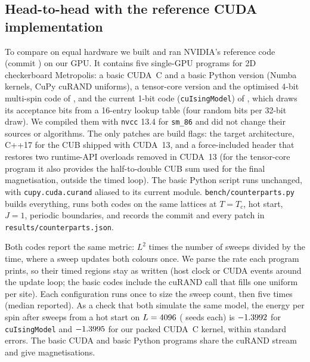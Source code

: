 \documentclass[11pt]{article}
\begin{document}
\subsection{Head-to-head with the reference CUDA implementation}
\label{sec:headtohead}

To compare on equal hardware we built and ran NVIDIA's reference code \citep{IsingGPURepo}
(commit \texttt{\cpCommit}) on our GPU. It contains five single-GPU programs for 2D
checkerboard Metropolis: a basic CUDA~C and a basic
Python version (Numba kernels, CuPy cuRAND uniforms), a tensor-core version and the optimised
4-bit multi-spin code of \citet{Romero2020}, and the current 1-bit code (\texttt{cuIsingModel})
of \citet{Bisson2025}, which draws its acceptance bits from a 16-entry lookup table (four
random bits per 32-bit draw). We compiled them with \texttt{nvcc} 13.4 for \texttt{sm\_86} and
did not change their sources or algorithms. The only patches are build flags: the target
architecture, C++17 for the CUB shipped with CUDA~13, and a force-included header that restores
two runtime-API overloads removed in CUDA~13 (for the tensor-core program it also provides the
half-to-double CUB sum used for the final magnetisation, outside the timed loop). The basic
Python script runs unchanged, with \texttt{cupy.cuda.curand} aliased to its current module.
\texttt{bench/counterparts.py} builds everything, runs both codes on the same lattices at
$T=T_c$, hot start, $J=1$, periodic boundaries, and records the commit and every patch in
\texttt{results/counterparts.json}.

Both codes report the same metric: $L^2$ times the number of sweeps divided by the time, where a
sweep updates both colours once. We parse the rate each program prints, so their timed regions
stay as written (host clock or CUDA events around the update loop; the basic codes include the
cuRAND call that fills one uniform per site). Each configuration runs once to size the sweep count, then
five times (median reported). As a check that both simulate the same model, the
energy per spin after \cpEnergySweeps{} sweeps from a hot start on $L=4096$ (\cpEnergySeeds{} seeds
each) is $-1.3992$ for \texttt{cuIsingModel} and $-1.3995$ for our packed CUDA~C
kernel, within \cpEnergyMaxZ{} standard errors. The basic CUDA and basic Python programs share
the cuRAND stream and give \cpBasicIdentical{} magnetisations.

\end{document}
